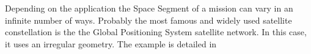 Depending on the application the Space Segment of a mission can vary in an infinite number of ways. Probably the most famous and widely used satellite constellation is the the Global Positioning System satellite network. In this case, it uses an irregular geometry. The example is detailed in \cite[Chapter 3, Section 1]{annex1}